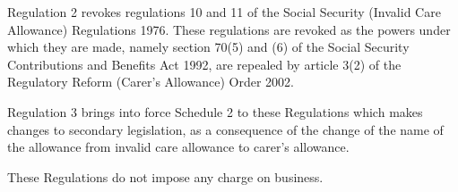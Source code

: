 \documentclass[12pt,a4paper]{article}
\begin{document}
Regulation 2 revokes regulations 10 and 11 of the Social Security (Invalid Care Allowance) Regulations 1976. These regulations are revoked as the powers under which they are made, namely section 70(5) and (6) of the Social Security Contributions and Benefits Act 1992, are repealed by article 3(2) of the Regulatory Reform (Carer’s Allowance) Order 2002.

Regulation 3 brings into force Schedule 2 to these Regulations which makes changes to secondary legislation, as a consequence of the change of the name of the allowance from invalid care allowance to carer’s allowance.

These Regulations do not impose any charge on business. 
\end{document}

